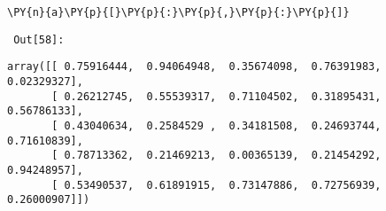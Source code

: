 {\par%
\vspace{-1\baselineskip}%
}%
\begin{notebookcell}[58]%
\begin{addmargin}[\cellleftmargin]{0em}%
{\smaller%
\par%
%
\vspace{-1\smallerfontscale}%
\begin{Verbatim}[commandchars=\\\{\}]
\PY{n}{a}\PY{p}{[}\PY{p}{:}\PY{p}{,}\PY{p}{:}\PY{p}{]}
\end{Verbatim}
%
\par%
\vspace{-1\smallerfontscale}}%
\end{addmargin}
\end{notebookcell}

\par\vspace{1\smallerfontscale}%
    
        {\par%
        \vspace{-1\smallerfontscale}%
        \noindent%
        \begin{minipage}{\cellleftmargin}%
    \hfill%
    {\smaller%
    \tt%
    \color{nbframe-out-prompt}%
    Out[58]:}%
    \hspace{\inputpadding}%
    \hspace{0em}%
    \hspace{3pt}%
    \end{minipage}%
        }%
    \begin{addmargin}[\cellleftmargin]{0em}%
    {\smaller%
    \vspace{-1\smallerfontscale}%
    
    
    
    \begin{verbatim}
array([[ 0.75916444,  0.94064948,  0.35674098,  0.76391983,  0.02329327],
       [ 0.26212745,  0.55539317,  0.71104502,  0.31895431,  0.56786133],
       [ 0.43040634,  0.2584529 ,  0.34181508,  0.24693744,  0.71610839],
       [ 0.78713362,  0.21469213,  0.00365139,  0.21454292,  0.94248957],
       [ 0.53490537,  0.61891915,  0.73147886,  0.72756939,  0.26000907]])
    \end{verbatim}

    
}%
    \end{addmargin}%

